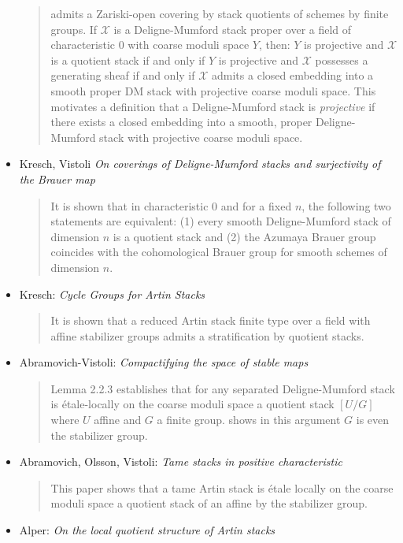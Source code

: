 \begin{itemize}
\begin{quote}
admits a Zariski-open covering by stack quotients of schemes by finite groups.
If $\mathcal{X}$ is a Deligne-Mumford stack proper over a field of
characteristic 0
with coarse moduli space $Y$, then: $Y$ is projective and $\mathcal{X}$ is a
quotient stack if and only if $Y$ is projective and $\mathcal{X}$
possesses a generating sheaf if and only if
$\mathcal{X}$ admits a closed embedding into a smooth proper DM stack with
projective
coarse moduli space. This motivates a definition that a Deligne-Mumford stack
is \emph{projective} if there exists a closed embedding into a smooth, proper
Deligne-Mumford stack with projective coarse moduli space.
\end{quote}
\item Kresch, Vistoli \emph{On coverings of Deligne-Mumford stacks and
surjectivity of the Brauer map} \cite{kresch-vistoli}
\begin{quote}
It is shown that in characteristic 0 and for a fixed $n$, the following two
statements are equivalent: (1) every smooth Deligne-Mumford stack of dimension
$n$ is a quotient stack and (2) the Azumaya Brauer group coincides with the
cohomological Brauer group for smooth schemes of dimension $n$.
\end{quote}
\item Kresch: \emph{Cycle Groups for Artin Stacks} \cite{kresch_cycle}
\begin{quote}
It is shown that a reduced Artin stack finite type over a field with affine
stabilizer groups admits a stratification by quotient stacks.
\end{quote}
\item Abramovich-Vistoli:
\emph{Compactifying the space of stable maps} \cite{abramovich-vistoli}
\begin{quote}
Lemma 2.2.3 establishes that for any separated Deligne-Mumford stack is
\'etale-locally on the coarse moduli space a quotient stack $[U/G]$ where $U$
affine and $G$ a finite group. \cite[Theorem 2.12]{olsson_homstacks} shows in
this argument $G$ is even the stabilizer group.
\end{quote}
\item Abramovich, Olsson, Vistoli:
\emph{Tame stacks in positive characteristic} \cite{tame}
\begin{quote}
This paper shows that a tame Artin stack is \'etale locally on the coarse
moduli space a quotient stack of an affine by the stabilizer group.
\end{quote}
\item Alper: \emph{On the local quotient structure of Artin stacks}

\end{itemize}
